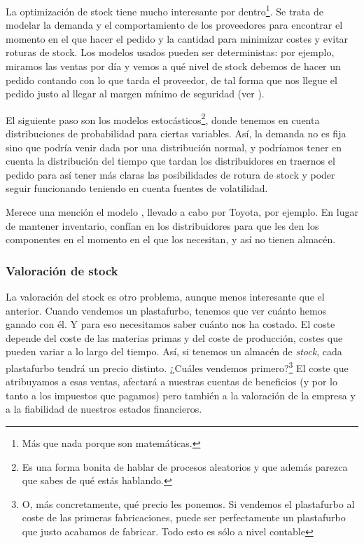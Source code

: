 \documentclass[nochap,palatino,shortheader]{apuntes}
\begin{document}
La optimización de stock tiene mucho interesante por dentro\footnote{Más que nada porque son matemáticas.}. Se trata de modelar la demanda y el comportamiento de los proveedores para encontrar el momento en el que hacer el pedido y la cantidad para minimizar costes y evitar roturas de stock. Los modelos usados pueden ser deterministas: por ejemplo, miramos las ventas por día y vemos a qué nivel de stock debemos de hacer un pedido contando con lo que tarda el proveedor, de tal forma que nos llegue el pedido justo al llegar al margen mínimo de seguridad (ver ).

El siguiente paso son los modelos estocásticos\footnote{Es una forma bonita de hablar de procesos aleatorios y que además parezca que sabes de qué estás hablando.}, donde tenemos en cuenta distribuciones de probabilidad para ciertas variables. Así, la demanda no es fija sino que podría venir dada por una distribución normal, y podríamos tener en cuenta la distribución del tiempo que tardan los distribuidores en traernos el pedido para así tener más claras las posibilidades de rotura de stock y poder seguir funcionando teniendo en cuenta fuentes de volatilidad.

Merece una mención el modelo , llevado a cabo por Toyota, por ejemplo. En lugar de mantener inventario, confían en los distribuidores para que les den los componentes en el momento en el que los necesitan, y así no tienen almacén.

\subsubsection{Valoración de stock}

La valoración del stock es otro problema, aunque menos interesante que el anterior. Cuando vendemos un plastafurbo, tenemos que ver cuánto hemos ganado con él. Y para eso necesitamos saber cuánto nos ha costado. El coste depende del coste de las materias primas y del coste de producción, costes que pueden variar a lo largo del tiempo. Así, si tenemos un almacén de \textit{stock}, cada plastafurbo tendrá un precio distinto. ¿Cuáles vendemos primero?\footnote{O, más concretamente, qué precio les ponemos. Si vendemos el plastafurbo al coste de las primeras fabricaciones, puede ser perfectamente un plastafurbo que justo acabamos de fabricar. Todo esto es sólo a nivel contable } El coste que atribuyamos a esas ventas, afectará a nuestras cuentas de beneficios (y por lo tanto a los impuestos que pagamos) pero también a la valoración de la empresa y a la fiabilidad de nuestros estados financieros.
\end{document}
